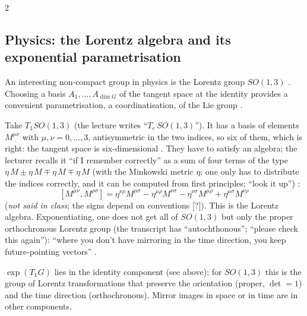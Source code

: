\begin{paracol}{2}
\subsection{Physics: the Lorentz algebra and its exponential parametrisation}\label{sec:rc-lorentz}
An interesting non-compact group in physics is the Lorentz group $SO(1,3)$ . Choosing a basis $A_1,\dots,A_{\dim G}$ of the tangent space at the identity provides a convenient parametrisation, a coordinatisation, of the Lie group  .

Take $T_{\mathbb 1}SO(1,3)$ (the lecture writes ``$T_e\,SO(1,3)$''). It has a basis of elements $M^{\mu\nu}$ with $\mu,\nu=0,\dots,3$, antisymmetric in the two indices, so six of them, which is right: the tangent space is six-dimensional   . They have to satisfy an algebra; the lecturer recalls it ``if I remember correctly'' as a sum of four terms of the type $\eta\,M\pm\eta\,M\mp\eta\,M\mp\eta\,M$ (with the Minkowski metric $\eta$; one only has to distribute the indices correctly, and it can be computed from first principles; ``look it up'')   :
\[
  [M^{\mu\nu},M^{\rho\sigma}]=\eta^{\nu\rho}M^{\mu\sigma}-\eta^{\mu\rho}M^{\nu\sigma}-\eta^{\nu\sigma}M^{\mu\rho}+\eta^{\mu\sigma}M^{\nu\rho}
\]
(\emph{not said in class}; the signs depend on conventions [?]). This is the Lorentz algebra. Exponentiating, one does not get all of $SO(1,3)$ but only the proper orthochronous Lorentz group (the transcript has ``autochthonous''; ``please check this again''): ``where you don't have mirroring in the time direction, you keep future-pointing vectors''    .
\begin{coursenote}
$\exp(T_{\mathbb 1}G)$ lies in the identity component (see above); for $SO(1,3)$ this is the group of Lorentz transformations that preserve the orientation (proper, $\det=1$) and the time direction (orthochronous). Mirror images in space or in time are in other components. 
\end{coursenote}

\end{paracol}

